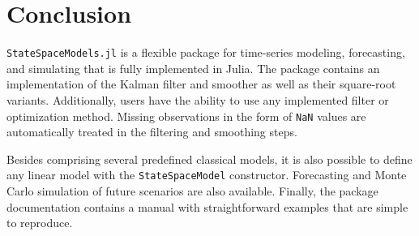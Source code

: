 \documentclass{juliacon}
\begin{document}
\section{Conclusion} \label{sec:conclusion}

\texttt{StateSpaceModels.jl} is a flexible package for time-series modeling, forecasting, and simulating that is fully implemented in Julia. The package contains an implementation of the Kalman filter and smoother as well as their square-root variants. Additionally, users have the ability to use any implemented filter or optimization method. Missing observations in the form of \texttt{NaN} values are automatically treated in the filtering and smoothing steps. 

Besides comprising several predefined classical models, it is also possible to define any linear model with the \texttt{StateSpaceModel} constructor. Forecasting and Monte Carlo simulation of future scenarios are also available. Finally, the package documentation contains a manual with straightforward examples that are simple to reproduce.


\end{document}
